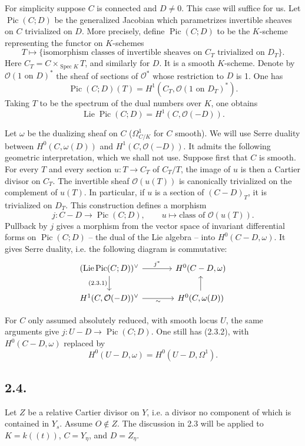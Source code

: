 \documentclass[11pt]{article}
\DeclareMathOperator{\Spec}{Spec}
\DeclareMathOperator{\Lie}{Lie}
\DeclareMathOperator{\Pic}{Pic}
\newcommand{\OO}{\mathcal O}
\newcommand{\dual}{^{\vee}}
\begin{document}
For simplicity suppose $C$ is connected and $D\ne0$. This case will suffice for us. Let $\Pic(C;D)$ be the generalized Jacobian which parametrizes invertible sheaves on $C$ trivialized on $D$. More precisely, define $\Pic(C;D)$ to be the $K$-scheme representing the functor on $K$-schemes
\[
        T\longmapsto\{
        \text{isomorphism classes of invertible sheaves on } C_T
        \text{ trivialized on } D_T\}.
\]
Here $C_T=C\times_{\Spec K}T$, and similarly for $D$. It is a smooth $K$-scheme. Denote by $\OO(1\text{ on }D)^*$ the sheaf of sections of $\OO^*$ whose restriction to $D$ is 1. One has
\[
        \Pic(C;D)(T)=H^1(C_T,\OO(1\text{ on }D_T)^*).
\]
Taking $T$ to be the spectrum of the dual numbers over $K$, one obtains
\begin{equation}
        \Lie\Pic(C;D)=H^1(C,\OO(-D)). \tag{2.3.1}
\end{equation}

Let $\omega$ be the dualizing sheaf on $C$ ($\Omega^1_{C/K}$ for $C$ smooth). We will use Serre duality between $H^0(C,\omega(D))$ and $H^1(C,\OO(-D))$. It admits the following geometric interpretation, which we shall not use. Suppose first that $C$ is smooth. For every $T$ and every section $u:T\to C_T$ of $C_T/T$, the image of $u$ is then a Cartier divisor on $C_T$. The invertible sheaf $\OO(u(T))$ is canonically trivialized on the complement of $u(T)$. In particular, if $u$ is a section of $(C-D)_T$, it is trivialized on $D_T$. This construction defines a morphism
\begin{equation}
        j:C-D\longrightarrow\Pic(C;D),\qquad
        u\longmapsto\text{class of }\OO(u(T)). \tag{2.3.2}
\end{equation}
Pullback by $j$ gives a morphism from the vector space of invariant differential forms on $\Pic(C;D)$ -- the dual of the Lie algebra -- into $H^0(C-D,\omega)$. It gives Serre duality, i.e. the following diagram is commutative:
\[
\begin{tikzcd}[column sep=large]
(\Lie\Pic(C;D))\dual \arrow[r,"j^*"] \arrow[d,"{(2.3.1)}"'] & H^0(C-D,\omega) \\
H^1(C,\OO(-D))\dual \arrow[r,"\sim"'] & H^0(C,\omega(D)) \arrow[u]
\end{tikzcd}
\]

For $C$ only assumed absolutely reduced, with smooth locus $U$, the same arguments give $j:U-D\to\Pic(C;D)$. One still has (2.3.2), with $H^0(C-D,\omega)$ replaced by
\[
        H^0(U-D,\omega)=H^0(U-D,\Omega^1).
\]

\subsection*{2.4.}
Let $Z$ be a relative Cartier divisor on $Y$, i.e. a divisor no component of which is contained in $Y_s$. Assume $O\notin Z$. The discussion in 2.3 will be applied to $K=k((t))$, $C=Y_\eta$, and $D=Z_\eta$.
\end{document}
